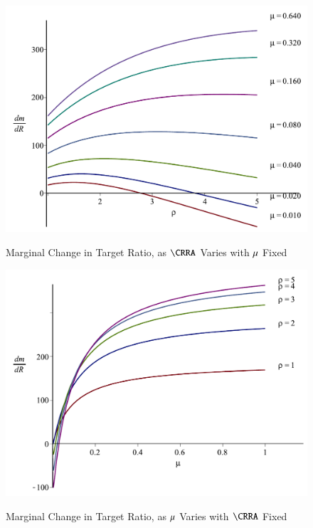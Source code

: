 \documentclass[titlepage,abstract]{\econtex}\newcommand{\texname}{ctDiscrete}
\begin{document}
\begin{figure}%
\caption{Marginal Change in Target Ratio, as $\CRRA$ Varies with $\mu$ Fixed}%
\medskip%
\includegraphics{./Figures/mSlopeUrateFixedCRRAVaries_4}%
\label{fig:mSlopeUrateFixedCRRAVaries}%
\end{figure}

\begin{figure}%
\caption{Marginal Change in Target Ratio, as $\mu$ Varies with $\CRRA$ Fixed}%
\medskip%
\includegraphics{./Figures/mSlopeCRRAFixedUrateVaries_4}%
\label{fig:mSlopeCRRAFixedUrateVaries}%
\end{figure}
\end{document}

